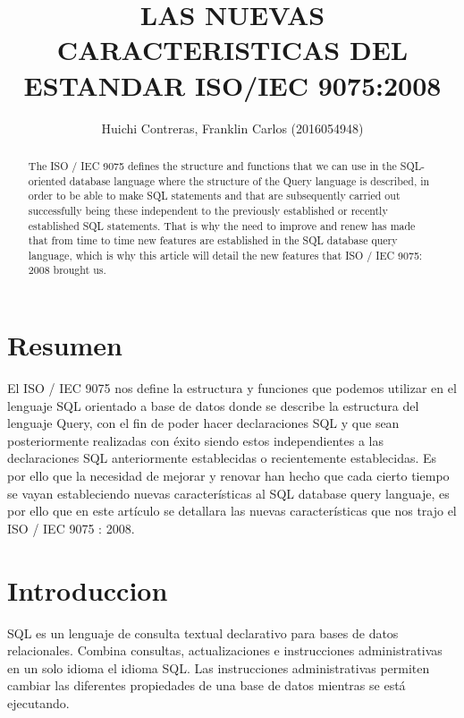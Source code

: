 \documentclass[preprint,12pt]{elsarticle}
\begin{document}
	
	\begin{frontmatter}

		\title{\huge LAS NUEVAS CARACTERISTICAS DEL ESTANDAR ISO/IEC 9075:2008}
		
		\author{Huichi Contreras, Franklin Carlos               (2016054948)}
		
		\address{Tacna, Perú}
		
		\begin{abstract}
The ISO / IEC 9075 defines the structure and functions that we can use in the SQL-oriented database language where the structure of the Query language is described, in order to be able to make SQL statements and that are subsequently carried out successfully being these independent to the previously established or recently established SQL statements. That is why the need to improve and renew has made that from time to time new features are established in the SQL database query language, which is why this article will detail the new features that ISO / IEC 9075: 2008 brought us.
		\end{abstract}
\end{frontmatter}
	
	\section{Resumen}

El ISO / IEC 9075 nos define la estructura y funciones que podemos utilizar en el lenguaje SQL orientado a base de datos donde se describe la estructura del lenguaje Query, con el fin de poder hacer declaraciones SQL y que sean posteriormente realizadas con éxito siendo estos independientes a las declaraciones SQL anteriormente establecidas o recientemente establecidas. Es por ello que la necesidad de mejorar y renovar han hecho que cada cierto tiempo se vayan estableciendo nuevas características al SQL database query languaje, es por ello que en este artículo se detallara las nuevas características que nos trajo el ISO / IEC 9075 : 2008.

	
\section{Introduccion}
SQL es un lenguaje de consulta textual declarativo para bases de datos relacionales. Combina consultas, actualizaciones e instrucciones administrativas en un solo idioma el idioma SQL. Las instrucciones administrativas permiten cambiar las diferentes propiedades de una base de datos mientras se está ejecutando.
\end{document}
